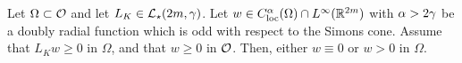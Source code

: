 \begin{proposition}
\label{Prop:StrongMaximumPrincipleForOddFunctions} 
Let $\Omega \subset \mathcal{O}$ and let $L_K  \in \mathcal{L}_\star (2m,  \gamma)$.  Let $w\in C^{\alpha}_{\mathrm{loc}}(\Omega)\cap L^\infty(\mathbb{R}^{2m})$ with $\alpha > 2\gamma$ be a doubly radial function which is odd with respect to the Simons cone. Assume that $L_K w \geq 0$ in $\Omega$, and that $w\geq 0$ in $\mathcal{O}$. Then, either $w\equiv 0$ or $w > 0$ in $\Omega$.
\end{proposition}






